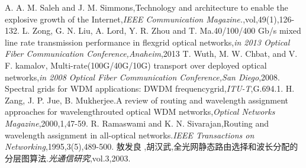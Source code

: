 \documentclass[master]{thesis-uestc}
\begin{document}
\begin{thebibliography}{1}
A. A. M. Saleh and J. M. Simmons,Technology and architecture to enable the explosive growth of the Internet,\emph{IEEE Communication Magazine.},vol,49(1),126-132.
L. Zong, G. N. Liu, A. Lord, Y. R. Zhou and T. Ma.40/100/400 Gb/s mixed line rate transmission performance in flexgrid optical networks,\emph{in 2013 Optical Fiber Communication Conference,Anaheim},2013
T. Wuth, M. W. Chbat, and V. F. kamalov, Multi-rate(100G/40G/10G) transport over deployed optical networks,\emph{in 2008 Optical Fiber Communication Conference,San Diego},2008.
Spectral grids for WDM applications: DWDM frequencygrid,\emph{ITU-T},G.694.1.
H. Zang, J. P. Jue, B. Mukherjee.A review of routing and wavelength assignment approaches for wavelengthrouted optical WDM networks,\emph{Optical Networks Magazine},2000,1,47-59.
R. Ramaswami and K. N. Sivarajan,Routing and wavelength assignment in all-optical networks.\emph{IEEE Transactions on Networking},1995,3(5),489-500.
敖发良 ,胡汉武,全光网静态路由选择和波长分配的分层图算法.\emph{光通信研究},vol.3,2003.
\end{thebibliography}
\end{document}
